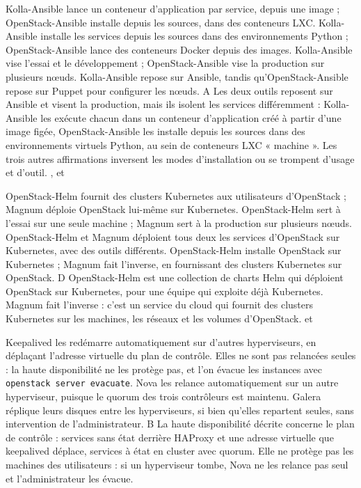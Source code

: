   {Kolla-Ansible lance un conteneur d'application par service, depuis une image ; OpenStack-Ansible installe depuis les sources, dans des conteneurs LXC.}
  {Kolla-Ansible installe les services depuis les sources dans des environnements Python ; OpenStack-Ansible lance des conteneurs Docker depuis des images.}
  {Kolla-Ansible vise l'essai et le développement ; OpenStack-Ansible vise la production sur plusieurs nœuds.}
  {Kolla-Ansible repose sur Ansible, tandis qu'OpenStack-Ansible repose sur Puppet pour configurer les nœuds.}
  {A}
  {Les deux outils reposent sur Ansible et visent la production, mais ils isolent les services différemment : Kolla-Ansible les exécute chacun dans un conteneur d'application créé à partir d'une image figée, OpenStack-Ansible les installe depuis les sources dans des environnements virtuels Python, au sein de conteneurs LXC « machine ». Les trois autres affirmations inversent les modes d'installation ou se trompent d'usage et d'outil.}
  {,  et }

  {OpenStack-Helm fournit des clusters Kubernetes aux utilisateurs d'OpenStack ; Magnum déploie OpenStack lui-même sur Kubernetes.}
  {OpenStack-Helm sert à l'essai sur une seule machine ; Magnum sert à la production sur plusieurs nœuds.}
  {OpenStack-Helm et Magnum déploient tous deux les services d'OpenStack sur Kubernetes, avec des outils différents.}
  {OpenStack-Helm installe OpenStack sur Kubernetes ; Magnum fait l'inverse, en fournissant des clusters Kubernetes sur OpenStack.}
  {D}
  {OpenStack-Helm est une collection de charts Helm qui déploient OpenStack sur Kubernetes, pour une équipe qui exploite déjà Kubernetes. Magnum fait l'inverse : c'est un service du cloud qui fournit des clusters Kubernetes sur les machines, les réseaux et les volumes d'OpenStack.}
  { et }

  {Keepalived les redémarre automatiquement sur d'autres hyperviseurs, en déplaçant l'adresse virtuelle du plan de contrôle.}
  {Elles ne sont pas relancées seules : la haute disponibilité ne les protège pas, et l'on évacue les instances avec \texttt{openstack server evacuate}.}
  {Nova les relance automatiquement sur un autre hyperviseur, puisque le quorum des trois contrôleurs est maintenu.}
  {Galera réplique leurs disques entre les hyperviseurs, si bien qu'elles repartent seules, sans intervention de l'administrateur.}
  {B}
  {La haute disponibilité décrite concerne le plan de contrôle : services sans état derrière HAProxy et une adresse virtuelle que keepalived déplace, services à état en cluster avec quorum. Elle ne protège pas les machines des utilisateurs : si un hyperviseur tombe, Nova ne les relance pas seul et l'administrateur les évacue.}
  {}

